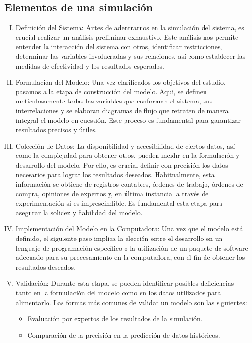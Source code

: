 \subsection{Elementos de una simulación \cite{Simulación}}
\begin{enumerate} [I. ]
    \item Definición del Sistema: 
    Antes de adentrarnos en la simulación del sistema, es crucial realizar un análisis preliminar exhaustivo. Este análisis nos permite entender la interacción del sistema con otros, identificar restricciones, determinar las variables involucradas y sus relaciones, así como establecer las medidas de efectividad y los resultados esperados.
    \item Formulación del Modelo: 
    Una vez clarificados los objetivos del estudio, pasamos a la etapa de construcción del modelo. Aquí, se definen meticulosamente todas las variables que conforman el sistema, sus interrelaciones y se elaboran diagramas de flujo que retraten de manera integral el modelo en cuestión. Este proceso es fundamental para garantizar resultados precisos y útiles.
    \item Colección de Datos: 
    La disponibilidad y accesibilidad de ciertos datos, así como la complejidad para obtener otros, pueden incidir en la formulación y desarrollo del modelo. Por ello, es crucial definir con precisión los datos necesarios para lograr los resultados deseados. Habitualmente, esta información se obtiene de registros contables, órdenes de trabajo, órdenes de compra, opiniones de expertos y, en última instancia, a través de experimentación si es imprescindible. Es fundamental esta etapa para asegurar la solidez y fiabilidad del modelo.
    \item Implementación del Modelo en la Computadora:
    Una vez que el modelo está definido, el siguiente paso implica la elección entre el desarrollo en un lenguaje de programación específico o la utilización de un paquete de software adecuado para su procesamiento en la computadora, con el fin de obtener los resultados deseados.
    \item Validación: 
    Durante esta etapa, se pueden identificar posibles deficiencias tanto en la formulación del modelo como en los datos utilizados para alimentarlo. Las formas más comunes de validar un modelo son las siguientes:
    \begin{itemize}
        \item Evaluación por expertos de los resultados de la simulación.
        \item Comparación de la precisión en la predicción de datos históricos.

\end{itemize}
\end{enumerate}
